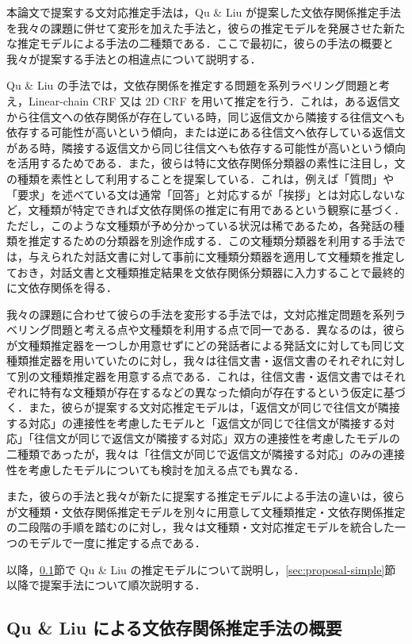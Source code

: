 \documentclass[japanese]{jnlp_1.4}
\begin{document}
本論文で提案する文対応推定手法は，Qu \& Liu が提案した文依存関係推定手法 \cite{Zhonghua2012} を我々の課題に併せて変形を加えた手法と，彼らの推定モデルを発展させた新たな推定モデルによる手法の二種類である．ここで最初に，彼らの手法の概要と我々が提案する手法との相違点について説明する．

Qu \& Liu の手法では，文依存関係を推定する問題を系列ラベリング問題と考え，Linear-chain CRF 又は 2D CRF を用いて推定を行う．これは，ある返信文から往信文への依存関係が存在している時，同じ返信文から隣接する往信文へも依存する可能性が高いという傾向，または逆にある往信文へ依存している返信文がある時，隣接する返信文から同じ往信文へも依存する可能性が高いという傾向を活用するためである．また，彼らは特に文依存関係分類器の素性に注目し，文の種類を素性として利用することを提案している．これは，例えば「質問」や「要求」を述べている文は通常「回答」と対応するが「挨拶」とは対応しないなど，文種類が特定できれば文依存関係の推定に有用であるという観察に基づく．ただし，このような文種類が予め分かっている状況は稀であるため，各発話の種類を推定するための分類器を別途作成する．この文種類分類器を利用する手法では，与えられた対話文書に対して事前に文種類分類器を適用して文種類を推定しておき，対話文書と文種類推定結果を文依存関係分類器に入力することで最終的に文依存関係を得る．

我々の課題に合わせて彼らの手法を変形する手法では，文対応推定問題を系列ラベリング問題と考える点や文種類を利用する点で同一である．異なるのは，彼らが文種類推定器を一つしか用意せずにどの発話者による発話文に対しても同じ文種類推定器を用いていたのに対し，我々は往信文書・返信文書のそれぞれに対して別の文種類推定器を用意する点である．これは，往信文書・返信文書ではそれぞれに特有な文種類が存在するなどの異なった傾向が存在するという仮定に基づく．また，彼らが提案する文対応推定モデルは，「返信文が同じで往信文が隣接する対応」の連接性を考慮したモデルと「返信文が同じで往信文が隣接する対応」「往信文が同じで返信文が隣接する対応」双方の連接性を考慮したモデルの二種類であったが，我々は「往信文が同じで返信文が隣接する対応」のみの連接性を考慮したモデルについても検討を加える点でも異なる．

また，彼らの手法と我々が新たに提案する推定モデルによる手法の違いは，彼らが文種類・文依存関係推定モデルを別々に用意して文種類推定・文依存関係推定の二段階の手順を踏むのに対し，我々は文種類・文対応推定モデルを統合した一つのモデルで一度に推定する点である．

以降，\ref{sec:qu-liu}節で Qu \& Liu の推定モデルについて説明し，\ref{sec:proposal-simple}節以降で提案手法について順次説明する．


\subsection{Qu \& Liu による文依存関係推定手法の概要} \label{sec:qu-liu}
\end{document}
